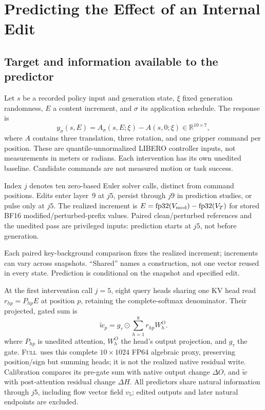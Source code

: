 \documentclass[conference]{IEEEtran}
\newcommand{\full}{\textsc{Full}}
\begin{document}
\section{Predicting the Effect of an Internal Edit}
\label{sec:method}
\subsection{Target and information available to the predictor}
Let $s$ be a recorded policy input and generation state, $\xi$ fixed generation randomness, $E$ a content increment, and $\sigma$ its application schedule. The response is
\begin{equation}
 y_{\sigma}(s,E)=A_{\sigma}(s,E;\xi)-A(s,0;\xi)
 \in\mathbb{R}^{10\times7},
 \label{eq:target}
\end{equation}
where $A$ contains three translation, three rotation, and one gripper command per position. These are quantile-unnormalized LIBERO controller inputs, not measurements in meters or radians. Each intervention has its own unedited baseline. Candidate commands are not measured motion or task success.

Index $j$ denotes ten zero-based Euler solver calls, distinct from command positions. Edits enter layer~9 at $j5$, persist through $j9$ in prediction studies, or pulse only at $j5$. The realized increment is $E=\operatorname{fp32}(V_{\rm mod})-\operatorname{fp32}(V_T)$ for stored BF16 modified/perturbed-prefix values. Paired clean/perturbed references and the unedited pass are privileged inputs: prediction starts at $j5$, not before generation.

Each paired key-background comparison fixes the realized increment; increments can vary across snapshots. ``Shared'' names a construction, not one vector reused in every state. Prediction is conditional on the snapshot and specified edit.

At the first intervention call $j=5$, eight query heads sharing one KV head read $r_{hp}=P_{hp}E$ at position $p$, retaining the complete-softmax denominator. Their projected, gated sum is
\begin{equation}
 \widetilde w_p=g_{\tau}\odot\sum_{h=1}^{8}r_{hp}W_h^O .
 \label{eq:write}
\end{equation}
where $P_{hp}$ is unedited attention, $W_h^O$ the head's output projection, and $g_\tau$ the gate. \full\ uses this complete $10\times1024$ FP64 algebraic proxy, preserving position/sign but summing heads; it is not the realized native residual write. Calibration compares its pre-gate sum with native output change $\Delta O$, and $\widetilde w$ with post-attention residual change $\Delta H$. All predictors share natural information through $j5$, including flow vector field $v_5$; edited outputs and later natural endpoints are excluded.
\end{document}
